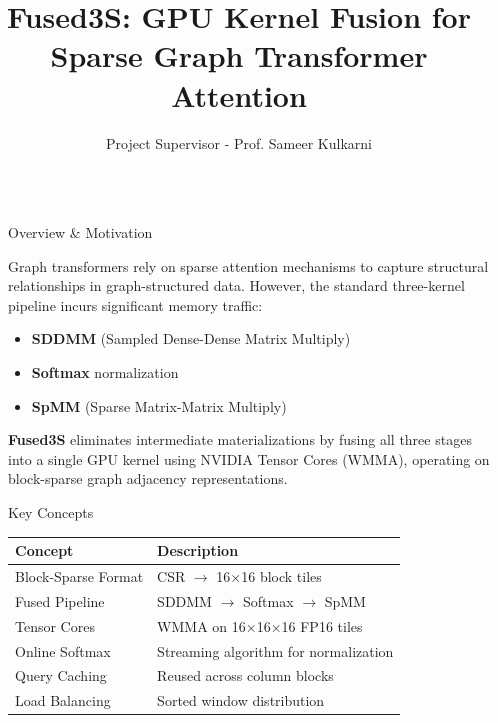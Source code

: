 \documentclass[final]{beamer}
\title{Fused3S: GPU Kernel Fusion for Sparse Graph Transformer Attention}
\author{Project Supervisor - Prof. Sameer Kulkarni}
\institute[shortinst]{Fused Sparse-Dense Graph Attention on Tensor Cores}
\newlength{\sepwidth}
\newlength{\colwidth}
\newcommand{\separatorcolumn}{\begin{column}{\sepwidth}\end{column}}
\begin{document}
\begin{frame}[t]
\begin{columns}[t]
\separatorcolumn


\begin{column}{\colwidth}

  \begin{block}{Overview \& Motivation}

    Graph transformers rely on sparse attention mechanisms to capture structural relationships in graph-structured data. However, the standard three-kernel pipeline incurs significant memory traffic:
    
    \begin{itemize}
      \item \textbf{SDDMM} (Sampled Dense-Dense Matrix Multiply)
      \item \textbf{Softmax} normalization
      \item \textbf{SpMM} (Sparse Matrix-Matrix Multiply)
    \end{itemize}

    \vspace{0.5em}
    
    \textbf{Fused3S} eliminates intermediate materializations by fusing all three stages into a single GPU kernel using NVIDIA Tensor Cores (WMMA), operating on block-sparse graph adjacency representations.

  \end{block}

  \begin{block}{Key Concepts}

    \begin{tabular}{ll}
      \toprule
      \textbf{Concept} & \textbf{Description} \\
      \midrule
      Block-Sparse Format & CSR $\rightarrow$ 16×16 block tiles \\
      Fused Pipeline & SDDMM $\rightarrow$ Softmax $\rightarrow$ SpMM \\
      Tensor Cores & WMMA on 16×16×16 FP16 tiles \\
      Online Softmax & Streaming algorithm for normalization \\
      Query Caching & Reused across column blocks \\
      Load Balancing & Sorted window distribution \\
      \bottomrule
    \end{tabular}


\end{block}
\end{column}
\end{columns}
\end{frame}
\end{document}
